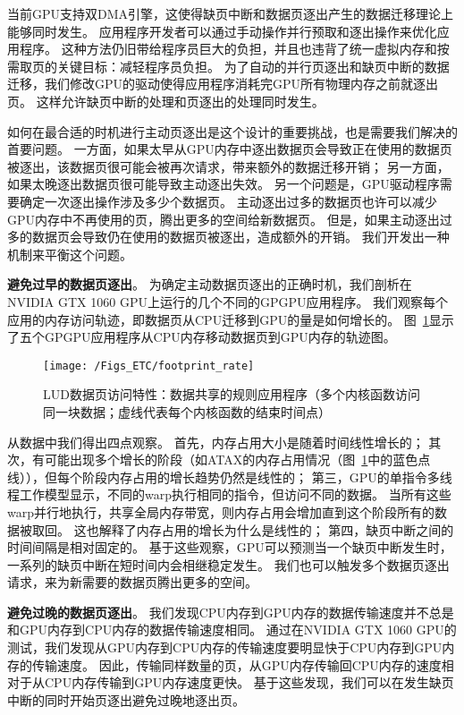 当前GPU支持双DMA引擎，这使得缺页中断和数据页逐出产生的数据迁移理论上能够同时发生。
应用程序开发者可以通过手动操作并行预取和逐出操作来优化应用程序。
这种方法仍旧带给程序员巨大的负担，并且也违背了统一虚拟内存和按需取页的关键目标：减轻程序员负担。
为了自动的并行页逐出和缺页中断的数据迁移，我们修改GPU的驱动使得应用程序消耗完GPU所有物理内存之前就逐出页。
这样允许缺页中断的处理和页逐出的处理同时发生。

如何在最合适的时机进行主动页逐出是这个设计的重要挑战，也是需要我们解决的首要问题。
一方面，如果太早从GPU内存中逐出数据页会导致正在使用的数据页被逐出，该数据页很可能会被再次请求，带来额外的数据迁移开销；
另一方面，如果太晚逐出数据页很可能导致主动逐出失效。
另一个问题是，GPU驱动程序需要确定一次逐出操作涉及多少个数据页。
主动逐出过多的数据页也许可以减少GPU内存中不再使用的页，腾出更多的空间给新数据页。
但是，如果主动逐出过多的数据页会导致仍在使用的数据页被逐出，造成额外的开销。
我们开发出一种机制来平衡这个问题。

\textbf{避免过早的数据页逐出}。
为确定主动数据页逐出的正确时机，我们剖析在NVIDIA GTX 1060 GPU上运行的几个不同的GPGPU应用程序。
我们观察每个应用的内存访问轨迹，即数据页从CPU迁移到GPU的量是如何增长的。
图~\ref{fig:footprint_rate}显示了五个GPGPU应用程序从CPU内存移动数据页到GPU内存的轨迹图。

\begin{figure}[htbp] %
  \centering
  \texttt{[image: /Figs\_ETC/footprint\_rate]}
  \caption{LUD数据页访问特性：数据共享的规则应用程序（多个内核函数访问同一块数据；虚线代表每个内核函数的结束时间点）}
  \label{fig:footprint_rate}
\end{figure}


从数据中我们得出四点观察。
首先，内存占用大小是随着时间线性增长的；
其次，有可能出现多个增长的阶段（如ATAX的内存占用情况（图~\ref{fig:footprint_rate}中的蓝色点线）），但每个阶段内存占用的增长趋势仍然是线性的；
第三，GPU的单指令多线程工作模型显示，不同的warp执行相同的指令，但访问不同的数据。
当所有这些warp并行地执行，共享全局内存带宽，则内存占用会增加直到这个阶段所有的数据被取回。
这也解释了内存占用的增长为什么是线性的；
第四，缺页中断之间的时间间隔是相对固定的。
基于这些观察，GPU可以预测当一个缺页中断发生时，一系列的缺页中断在短时间内会相继稳定发生。
我们也可以触发多个数据页逐出请求，来为新需要的数据页腾出更多的空间。

\textbf{避免过晚的数据页逐出}。
我们发现CPU内存到GPU内存的数据传输速度并不总是和GPU内存到CPU内存的数据传输速度相同。
通过在NVIDIA GTX 1060 GPU的测试，我们发现从GPU内存到CPU内存的传输速度要明显快于CPU内存到GPU内存的传输速度。
因此，传输同样数量的页，从GPU内存传输回CPU内存的速度相对于从CPU内存传输到GPU内存速度更快。
基于这些发现，我们可以在发生缺页中断的同时开始页逐出避免过晚地逐出页。

